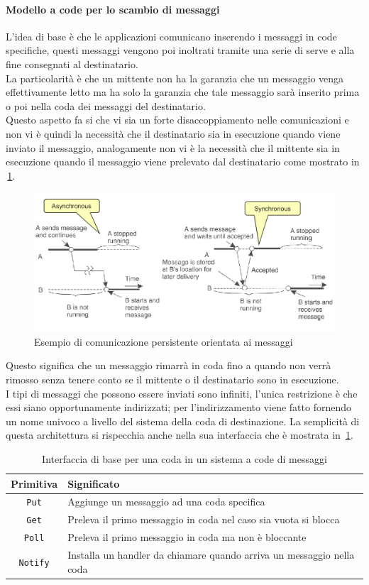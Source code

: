 \paragraph{Modello a code per lo scambio di messaggi}
L'idea di base è che le applicazioni comunicano inserendo i messaggi in code specifiche, questi messaggi vengono poi inoltrati tramite una serie di serve e alla fine consegnati al destinatario.\\
La particolarità è che un mittente non ha la garanzia che un messaggio venga effettivamente letto ma ha solo la garanzia che tale messaggio sarà inserito prima o poi nella coda dei messaggi del destinatario.\\
Questo aspetto fa si che vi sia un forte disaccoppiamento nelle comunicazioni e non vi è quindi la necessità che il destinatario sia in esecuzione quando viene inviato il messaggio, analogamente non vi è la necessità che il mittente sia in esecuzione quando il messaggio viene prelevato dal destinatario come mostrato in \figurename\,\ref{img:asincrono}.
\begin{figure}
\centering
\includegraphics[scale=0.5]{img/asincrono.png}
\caption{Esempio di comunicazione persistente orientata ai messaggi}\label{img:asincrono}
\end{figure}
Questo significa che un messaggio rimarrà in coda fino a quando non verrà rimosso senza tenere conto se il mittente o il destinatario sono in esecuzione.\\
I tipi di messaggi che possono essere inviati sono infiniti, l'unica restrizione è che essi siano opportunamente indirizzati; per l'indirizzamento viene fatto fornendo un nome univoco a livello del sistema della coda di destinazione.
La semplicità di questa architettura si rispecchia anche nella sua interfaccia che è mostrata in \tablename\,\ref{tab:queeue}.
\begin{table}
\centering
\begin{tabular}{|c|l|}
\hline
\textbf{Primitiva} & \textbf{Significato} \\
\hline
\texttt{Put} & Aggiunge un messaggio ad una coda specifica \\
\texttt{Get} & Preleva il primo messaggio in coda nel caso sia vuota si blocca \\
\texttt{Poll} & Preleva il primo messaggio in coda ma non è bloccante \\
\texttt{Notify} & Installa un handler da chiamare quando arriva un messaggio nella coda\\
\hline
\end{tabular}
\caption{Interfaccia di base per una coda in un sistema a code di messaggi}\label{tab:queeue}
\end{table}

